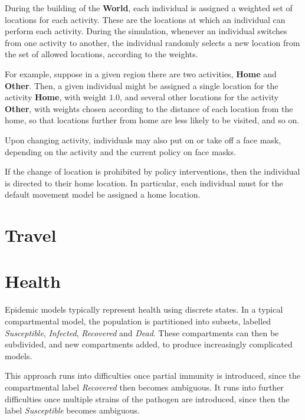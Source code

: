 \documentclass[10pt,letterpaper]{article}
\begin{document}
During the building of the \textbf{World}, each individual is assigned a weighted set of locations for each activity. These are the locations at which an individual can perform each activity. During the simulation, whenever an individual switches from one activity to another, the individual randomly selects a new location from the set of allowed locations, according to the weights.

For example, suppose in a given region there are two activities, \textbf{Home} and \textbf{Other}. Then, a given individual might be assigned a single location for the activity \textbf{Home}, with weight $1.0$, and several other locations for the activity \textbf{Other}, with weights chosen according to the distance of each location from the home, so that locations further from home are less likely to be visited, and so on.

Upon changing activity, individuals may also put on or take off a face mask, depending on the activity and the current policy on face masks.

If the change of location is prohibited by policy interventions, then the individual is directed to their home location. In particular, each individual must for the default movement model be assigned a home location.

\section{Travel}

\section{Health}
Epidemic models typically represent health using discrete states. In a typical compartmental model, the population is partitioned into subsets, labelled \textit{Susceptible}, \textit{Infected}, \textit{Recovered} and \textit{Dead}. These compartments can then be subdivided, and new compartments added, to produce increasingly complicated models.

This approach runs into difficulties once partial immunity is introduced, since the compartmental label \textit{Recovered} then becomes ambiguous. It runs into further difficulties once multiple strains of the pathogen are introduced, since then the label \textit{Susceptible} becomes ambiguous.
\end{document}
